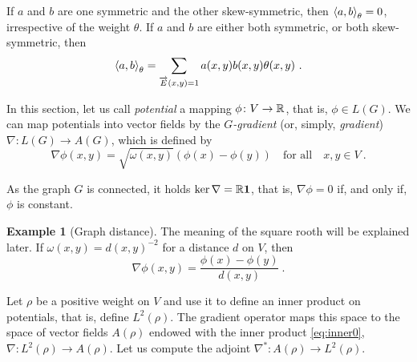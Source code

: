 \documentclass[12pt,a4paper]{amsart}
\theoremstyle{definition}
\newtheorem{example}{Example}
\begin{document}
If $a$ and $b$ are one symmetric and the other skew-symmetric, then
$\left\langle a,b\right\rangle_{\theta} = 0$, irrespective of the weight $\theta$.
If $a$ and $b$ are either both symmetric, or both skew-symmetric, then
\begin{equation}\label{eq:inner0}
  \left\langle a,b\right\rangle_{\theta} = \sum_{\overrightarrow E(x,y)=1}
  a(x,y)b(x,y) \theta(x,y) \ .
\end{equation}

In this section, let us call \emph{potential} a mapping
$\phi \colon V \to \mathbb{R}$, that is, $\phi\in L(G)$. We can map
potentials into vector fields by the \emph{$G$-gradient} (or, simply,
\emph{gradient}) $\nabla \colon L(G) \to A(G)$, which is defined by
\begin{equation}\label{eq:nabla}
  \nabla \phi(x,y) = \sqrt {\omega(x,y)} (\phi(x) - \phi(y)) \quad
  \text{for all} \quad x,y \in V \ .
\end{equation}

As the graph $G$ is connected, it holds $\ker \nabla = \mathbb{R} \bm 1$,
that is, $\nabla\phi=0$ if, and only if, $\phi$ is constant.

\begin{example}[Graph distance] The meaning of the square rooth will be
explained later. If $\omega(x,y) = d(x,y)^{-2}$ for a distance $d$ on
$V$, then
\begin{equation*}
  \nabla \phi (x,y)=\frac{\phi(x) - \phi(y)}{d(x,y)} \ .
\end{equation*}
\end{example}

Let $\rho$ be a positive weight on $V$ and use it to define an inner
product on potentials, that is, define $L^2(\rho)$. The gradient
operator maps this space to the space of vector fields $A(\rho)$
endowed with the inner product \eqref{eq:inner0},
$\nabla \colon L^2(\rho) \to A(\rho)$.  Let us compute the adjoint
$\nabla^* \colon A(\rho) \to L^2(\rho)$.
\end{document}
